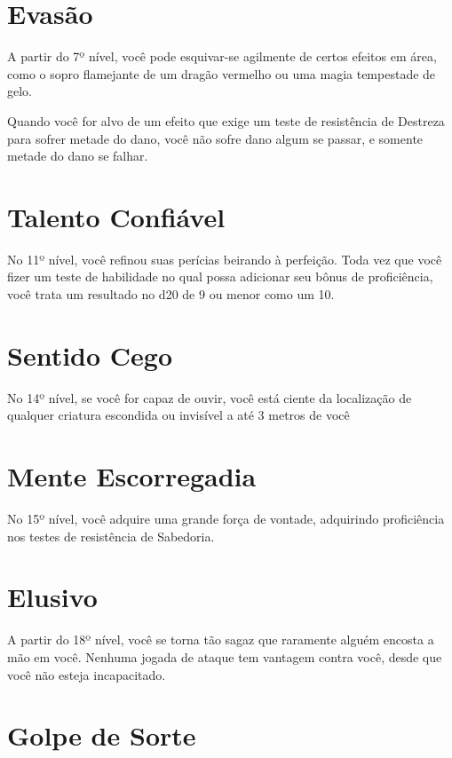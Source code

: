 \documentclass{RPG_Adventure}[2021/10/20]
\begin{document}
\section*{Evasão}%

A partir do 7º nível, você pode esquivar-se agilmente de certos efeitos em área,
como o sopro flamejante de um dragão vermelho ou uma magia tempestade de gelo.

Quando você for alvo de um efeito que exige um teste de resistência de Destreza
para sofrer metade do dano, você não sofre dano algum se passar, e somente
metade do dano se falhar.

\section*{Talento Confiável}%

No 11º nível, você refinou suas perícias beirando à perfeição. Toda vez que você
fizer um teste de habilidade no qual possa adicionar seu bônus de proficiência,
você trata um resultado no d20 de 9 ou menor como um 10.

\section*{Sentido Cego}%

No 14º nível, se você for capaz de ouvir, você está ciente da localização de
qualquer criatura escondida ou invisível a até 3 metros de você

\section*{Mente Escorregadia}%

No 15º nível, você adquire uma grande força de vontade, adquirindo proficiência
nos testes de resistência de Sabedoria.

\section*{Elusivo}%

A partir do 18º nível, você se torna tão sagaz que raramente alguém encosta a
mão em você. Nenhuma jogada de ataque tem vantagem contra você, desde que você
não esteja incapacitado.

\section*{Golpe de Sorte}%
\end{document}
